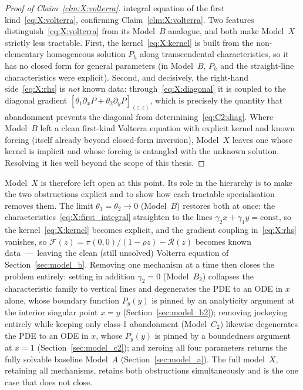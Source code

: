\begin{proof}[Proof of Claim~\ref{clm:X:volterra}]
integral equation of the first kind~\eqref{eq:X:volterra}, confirming
Claim~\ref{clm:X:volterra}.
Two features distinguish~\eqref{eq:X:volterra} from its Model~$B$ analogue, and both make
Model~$X$ strictly less tractable. First, the kernel~\eqref{eq:X:kernel} is built from the
non-elementary homogeneous solution $P_h$ along transcendental characteristics, so it has
no closed form for general parameters (in Model~$B$, $P_h$ and the straight-line
characteristics were explicit). Second, and decisively, the right-hand
side~\eqref{eq:X:rhs} is \emph{not} known data: through~\eqref{eq:X:diagonal} it is
coupled to the diagonal gradient $[\theta_1\partial_x P+\theta_2\partial_y P]_{(z,z)}$,
which is precisely the quantity that abandonment prevents the diagonal from
determining~\eqref{eq:C2:diag}. Where Model~$B$ left a clean first-kind Volterra equation
with explicit kernel and known forcing (itself already beyond closed-form inversion),
Model~$X$ leaves one whose kernel is implicit and whose forcing is entangled with the
unknown solution. Resolving it lies well beyond the scope of this thesis.
\end{proof}

Model~$X$ is therefore left open at this point. Its role in the hierarchy is to make the
two obstructions explicit and to show how each tractable specialisation removes them. The
limit $\theta_1=\theta_2\to0$ (Model~$B$) restores both at once: the
characteristics~\eqref{eq:X:first_integral} straighten to the lines
$\gamma_2 x+\gamma_1 y=\mathrm{const}$, so the kernel~\eqref{eq:X:kernel} becomes
explicit, and the gradient coupling in~\eqref{eq:X:rhs} vanishes, so
$\mathcal{F}(z)=\pi(0,0)/(1-\rho z)-\mathcal{R}(z)$ becomes known data~---~leaving the
clean (still unsolved) Volterra equation of Section~\ref{sec:model_b}. Removing one
mechanism at a time then closes the problem entirely: setting in addition $\gamma_2=0$
(Model~$B_2$) collapses the characteristic family to vertical lines and degenerates the
PDE to an ODE in $x$ alone, whose boundary function $P_y(y)$ is pinned by an analyticity
argument at the interior singular point $x=y$ (Section~\ref{sec:model_b2}); removing
jockeying entirely while keeping only class-1 abandonment (Model~$C_2$) likewise
degenerates the PDE to an ODE in $x$, whose $P_y(y)$ is pinned by a boundedness argument
at $x=1$ (Section~\ref{sec:model_c2}); and zeroing all four parameters returns the fully
solvable baseline Model~$A$ (Section~\ref{sec:model_a}). The full model~$X$, retaining
all mechanisms, retains both obstructions simultaneously and is the one case that does
not close.
